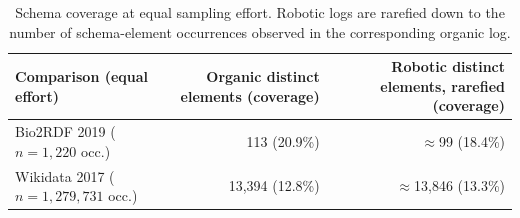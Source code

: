 \documentclass[sw]{iosart2x}
\providecommand{\DIFaddbeginFL}{} %
\providecommand{\DIFaddendFL}{} %
\providecommand{\DIFdelbeginFL}{} %
\providecommand{\DIFdelendFL}{} %
\providecommand{\DIFscaledelfig}{0.5}
\newlength{\DIFdelgraphicswidth} %
\newlength{\DIFdelgraphicsheight} %
\providecommand{\DIFaddincludegraphics}[2][]{{\color{blue}\fbox{\DIFOincludegraphics[#1]{#2}}}} %
\providecommand{\DIFdelincludegraphics}[2][]{%
\sbox{\DIFdelgraphicsbox}{\DIFOincludegraphics[#1]{#2}}%
\settoboxwidth{\DIFdelgraphicswidth}{\DIFdelgraphicsbox} %
\settoboxtotalheight{\DIFdelgraphicsheight}{\DIFdelgraphicsbox} %
\scalebox{\DIFscaledelfig}{%
\parbox[b]{\DIFdelgraphicswidth}{\usebox{\DIFdelgraphicsbox}\\[-\baselineskip] \rule{\DIFdelgraphicswidth}{0em}}\llap{\resizebox{\DIFdelgraphicswidth}{\DIFdelgraphicsheight}{%
\setlength{\unitlength}{\DIFdelgraphicswidth}%
\begin{picture}(1,1)%
\thicklines\linethickness{2pt} %
{\color[rgb]{1,0,0}\put(0,0){\framebox(1,1){}}}%
{\color[rgb]{1,0,0}\put(0,0){\line( 1,1){1}}}%
{\color[rgb]{1,0,0}\put(0,1){\line(1,-1){1}}}%
\end{picture}%
}\hspace*{3pt}}} %
} %
\DeclareRobustCommand{\DIFaddbeginFL}{\DIFOaddbeginFL \let\includegraphics\DIFaddincludegraphics} %
\DeclareRobustCommand{\DIFaddendFL}{\DIFOaddendFL \let\includegraphics\DIFOincludegraphics} %
\DeclareRobustCommand{\DIFdelbeginFL}{\DIFOdelbeginFL \let\includegraphics\DIFdelincludegraphics} %
\DeclareRobustCommand{\DIFdelendFL}{\DIFOaddendFL \let\includegraphics\DIFOincludegraphics} %
\begin{document}
\begin{table}[ht]
\centering
\caption{Schema coverage at equal sampling effort. Robotic logs are rarefied down to the number of schema-element occurrences observed in the corresponding organic log.}
\label{tab:rarefaction}
\DIFdelbeginFL %
\DIFdelendFL \DIFaddbeginFL \begin{tabular}{l|r|r}
\hline
Comparison (equal effort) & Organic distinct elements (coverage) & Robotic distinct elements, rarefied (coverage) \\
\hline
Bio2RDF 2019 ($n=1{,}220$ occ.) & 113 (20.9\%) & $\approx$99 (18.4\%) \\
Wikidata 2017 ($n=1{,}279{,}731$ occ.) & 13,394 (12.8\%) & $\approx$13,846 (13.3\%) \\
\hline
\end{tabular}
\DIFaddendFL \end{table}
\end{document}

